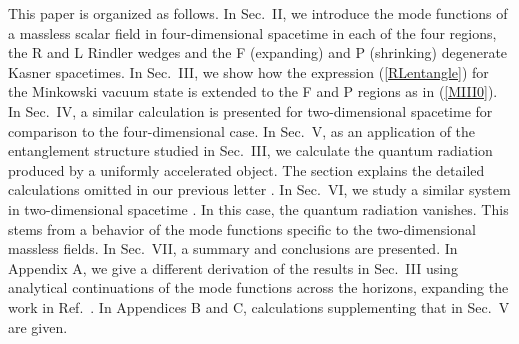 \documentclass[aps,prd,preprintnumbers,nofootinbib,showpacs]{revtex4}%
\begin{document}
\begin{widetext}
This paper is organized as follows. In Sec.~II, we introduce the mode functions
of a massless scalar field in four-dimensional spacetime in each of the four 
regions, the R and L Rindler wedges and the F (expanding) and 
P (shrinking) degenerate Kasner spacetimes. 
In Sec.~III, we show how the expression (\ref{RLentangle}) for the Minkowski vacuum state
is extended to the F and P regions as in (\ref{MIII0}).
In Sec.~IV, a similar calculation is presented for two-dimensional spacetime 
for comparison to the four-dimensional case.
In Sec.~V, as an application of the entanglement structure studied in Sec.~III, 
we calculate the quantum radiation produced by a uniformly accelerated object.
The section explains the detailed calculations omitted in our 
previous letter \cite{ITUY}. 
In Sec.~VI, we study a similar system in two-dimensional spacetime \cite{HuRaval}.
In this case, the quantum radiation vanishes. This stems from a behavior of the mode functions
specific to the two-dimensional massless fields.
In Sec.~VII, a summary and conclusions are presented. 
In Appendix A, we give a different derivation of the results in Sec.~III
using analytical continuations of the mode functions across the horizons, expanding the work in 
Ref.~\cite{Sommerfield}. 
In Appendices B and C, calculations supplementing that in Sec.~V are given.


\end{widetext}
\end{document}
